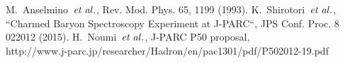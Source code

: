 \begin{thebibliography}{99}
   M.~Anselmino~${\it et\;al.}$, Rev. Mod. Phys. 65, 1199 (1993).
   K.~Shirotori~${\it et\;al.}$, ``Charmed Baryon Spectroscopy Experiment at J-PARC``, JPS Conf. Proc. 8 022012 (2015).
   H.~Noumi~${\it et\;al.}$, J-PARC P50 proposal, \\
  http://www.j-parc.jp/researcher/Hadron/en/pac1301/pdf/P502012-19.pdf











\end{thebibliography}
